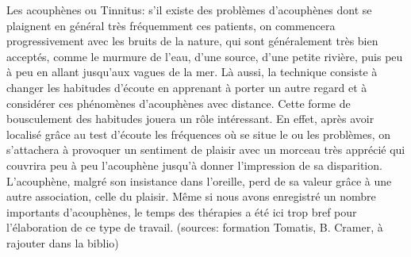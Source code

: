 Les acouphènes ou Tinnitus: 
s'il existe des problèmes d'acouphènes dont se plaignent en général très fréquemment ces patients, on 
commencera progressivement avec les bruits 
de la nature, qui sont généralement très bien acceptés, comme le murmure de l'eau, d'une source, d'une 
petite rivière, puis peu à peu  en allant jusqu'aux vagues de la mer. Là aussi, la technique consiste à 
changer les habitudes d'écoute en apprenant à porter un autre regard et  à  
considérer ces phénomènes d'acouphènes avec distance. Cette forme de bousculement des habitudes  
jouera un rôle intéressant. En effet, après avoir localisé grâce au test d'écoute les 
fréquences où se situe le ou les problèmes, on s'attachera à provoquer un sentiment de plaisir avec un 
morceau très apprécié qui couvrira peu à peu l'acouphène jusqu'à donner l'impression de sa 
disparition. L'acouphène, malgré son insistance dans l'oreille, perd de sa valeur grâce à une autre 
association, celle du plaisir. Même si nous avons enregistré un nombre importants d'acouphènes, le 
temps des thérapies a été ici trop bref pour l'élaboration de ce type de travail. (sources: formation 
Tomatis, B. Cramer, à rajouter dans la biblio)



